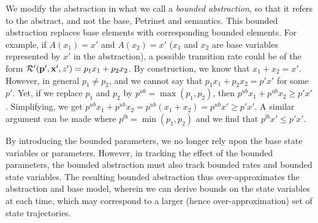 We modify the abstraction in what we call a \emph{bounded abstraction}, so that
it refers to the abstract, and not the base, Petrinet and semantics.  This
bounded abstraction replaces base elements with corresponding bounded elements.
For example, if $A(x_1) = x'$ and $A(x_2) = x'$ ($x_1$ and $x_2$ are base
variables represented by $x'$ in the abstraction), a possible transition rate
could be of the form
${\cal R}'({\bf p}', {\bf x}', z') = p_1 x_1 + p_2 x_2$.  By construction, we
know that $x_1 + x_2 = x'$.  However, in general $p_1 \not= p_2$, and we cannot
say that $p_1 x_1 + p_2 x_2 = p'x'$ for some $p'$.  Yet, if we replace $p_1$ and
$p_2$ by $p^{ub} = \max(p_1, p_2)$, then $p^{ub} x_1 + p^{ub} x_2 \geq p'x'$.  Simplifying, we
get $p^{ub} x_1 + p^{ub} x_2 = p^{ub}(x_1 + x_2) = p^{ub} x' \geq p'x'$.  A
similar argument can be made where $p^{lb} = \min(p_1, p_2)$ and we find that
$p^{lb} x' \leq p'x'$.  

By introducing the bounded parameters, we no longer
rely upon the base state variables or parameters.  However, in tracking the
effect of the bounded
parameters, the bounded abstraction must also track bounded rates and bounded
state variables.  The resulting bounded abstraction thus over-approximates the
abstraction and base model, wherein we can derive bounds on the state variables
at each time, which may correspond to a larger (hence over-approximation) set of
state trajectories.

